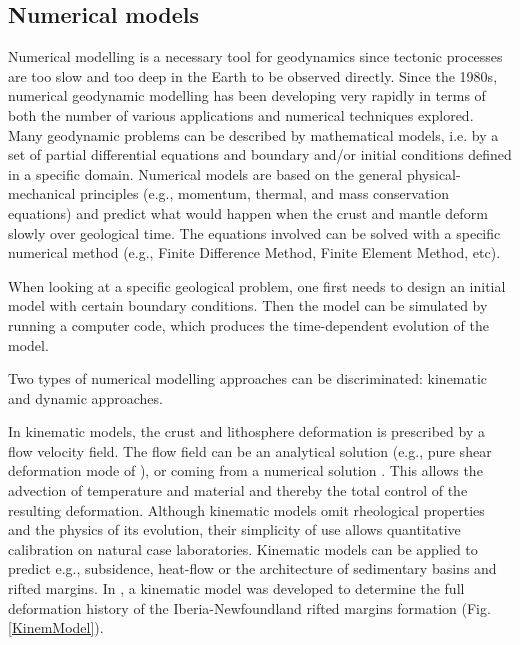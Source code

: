 \documentclass[a4paper]{article}
\begin{document}
\subsection{Numerical models}

Numerical modelling is a necessary tool for geodynamics since tectonic processes are too slow and too deep in the Earth to be observed directly. Since the 1980s, numerical geodynamic modelling has been developing very rapidly in terms of both the number of various applications and numerical techniques explored. Many geodynamic problems can be described by mathematical models, i.e. by a set of partial differential equations and boundary and/or initial conditions defined in a specific domain. Numerical models are based on the general physical-mechanical principles (e.g., momentum, thermal, and mass conservation equations) and predict what would happen when the crust and mantle deform slowly over geological time. The equations involved can be solved with a specific numerical method (e.g., Finite Difference Method, Finite Element Method, etc). 

When looking at a specific geological problem, one first needs to design an initial model with certain boundary conditions. Then the model can be simulated by running a computer code, which produces the time-dependent evolution of the model. 

Two types of numerical modelling approaches can be discriminated: kinematic and dynamic approaches. 

In kinematic models, the crust and lithosphere deformation is prescribed by a flow velocity field. The flow field can be an analytical solution (e.g., pure shear deformation mode of \cite{mcke78}), or coming from a numerical solution \cite{jekm16}. This allows the advection of temperature and material and thereby the total control of the resulting deformation. Although kinematic models omit rheological properties and the physics of its evolution, their simplicity of use allows quantitative calibration on natural case laboratories. Kinematic models can be applied to predict e.g., subsidence, heat-flow or the architecture of sedimentary basins and rifted margins. In \cite{jekm16}, a kinematic model was developed to determine the full deformation history of the Iberia-Newfoundland rifted margins formation (Fig. \ref{KinemModel}). 
\end{document}
